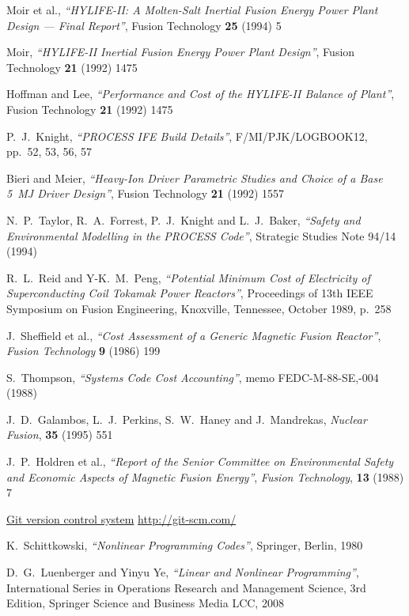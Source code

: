 \documentclass[11pt,a4paper]{report}
\begin{document}
\begin{thebibliography}{99}
Moir et al.,
\textit{``HYLIFE-II: A Molten-Salt Inertial Fusion Energy Power Plant Design
  --- Final Report''},
Fusion Technology \textbf{25} (1994) 5

Moir,
\textit{``HYLIFE-II Inertial Fusion Energy Power Plant Design''},
Fusion Technology \textbf{21} (1992) 1475

Hoffman and Lee,
\textit{``Performance and Cost of the HYLIFE-II Balance of Plant''},
Fusion Technology \textbf{21} (1992) 1475

P.\ J.\ Knight,
\textit{``PROCESS IFE Build Details''},
F/MI/PJK/LOGBOOK12, pp.\ 52, 53, 56, 57

Bieri and Meier,
\textit{``Heavy-Ion Driver Parametric Studies and Choice of a Base 5~MJ Driver
  Design''},
Fusion Technology \textbf{21} (1992) 1557

N.\ P.\ Taylor, R.\ A.\ Forrest, P.\ J.\ Knight and L.\ J.\ Baker,
\textit{``Safety and Environmental Modelling in the PROCESS Code''},
Strategic Studies Note 94/14 (1994)

R.\ L.\ Reid and Y-K.\ M.\ Peng,
\textit{``Potential Minimum Cost of Electricity of Superconducting Coil
Tokamak Power Reactors''},
Proceedings of 13th IEEE Symposium on Fusion Engineering, Knoxville,
Tennessee, October 1989, p.\ 258

J.\ Sheffield et al.,
\textit{``Cost Assessment of a Generic Magnetic Fusion Reactor''},
\textit{Fusion Technology} \textbf{9} (1986) 199

S.\ Thompson,
\textit{``Systems Code Cost Accounting''},
memo FEDC-M-88-SE,-004 (1988)

J.\ D.\ Galambos, L.\ J.\ Perkins, S.\ W.\ Haney and J.\ Mandrekas,
\textit{Nuclear Fusion}, \textbf{35} (1995) 551

J.\ P.\ Holdren et al.,
\textit{``Report of the Senior Committee on Environmental Safety and
Economic Aspects of Magnetic Fusion Energy''},
\textit{Fusion Technology}, \textbf{13} (1988) 7

\href{http://git-scm.com/}{Git version control system}
\url{http://git-scm.com/}

K.\ Schittkowski,
\textit{``Nonlinear Programming Codes''},
Springer, Berlin, 1980

D.\ G.\ Luenberger and Yinyu Ye,
\textit{``Linear and Nonlinear Programming''},
International Series in Operations Research and Management Science, 3rd Edition,
Springer Science and Business Media LCC, 2008


\end{thebibliography}
\end{document}
